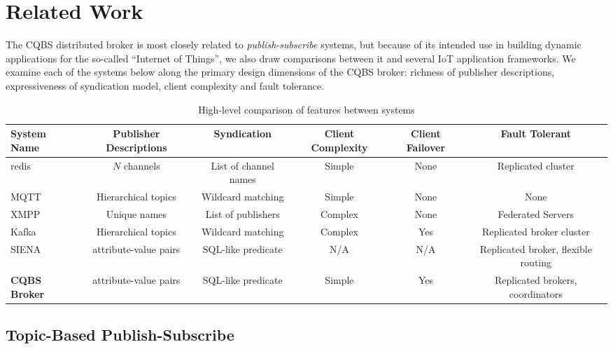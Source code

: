 \section{Related Work}


The CQBS distributed broker is most closely related to \emph{publish-subscribe} systems, but because of its intended use in building dynamic applications for the so-called ``Internet of Things'', we also draw comparisons between it and several IoT application frameworks.
We examine each of the systems below along the primary design dimensions of the CQBS broker: richness of publisher descriptions, expressiveness of syndication model, client complexity and fault tolerance.

\begin{table*}
\caption{High-level comparison of features between systems}
\label{table:comparison}
\centering
\begin{tabular}{|l|c|c|c|c|c|}
\hline
\textbf{System Name} & \textbf{Publisher Descriptions} & \textbf{Syndication} & \textbf{Client Complexity} & \textbf{Client Failover} & \textbf{Fault Tolerant} \\
\hline \hline
redis~\cite{redis} & $N$ channels & List of channel names & Simple & None & Replicated cluster \\
MQTT~\cite{locke2010mq}\cite{hunkeler2008mqtt} & Hierarchical topics & Wildcard matching & Simple & None & None \\
XMPP~\cite{saint2011extensible} & Unique names & List of publishers & Complex & None & Federated Servers \\
Kafka~\cite{kreps2011kafka} & Hierarchical topics & Wildcard matching & Complex & Yes & Replicated broker cluster \\
SIENA~\cite{carzaniga2000achieving} & attribute-value pairs & SQL-like predicate & N/A & N/A & Replicated broker, flexible routing \\
\textbf{CQBS Broker} & attribute-value pairs & SQL-like predicate & Simple & Yes & Replicated brokers, coordinators \\
\hline
\end{tabular}
\end{table*}

\subsection{Topic-Based Publish-Subscribe}

